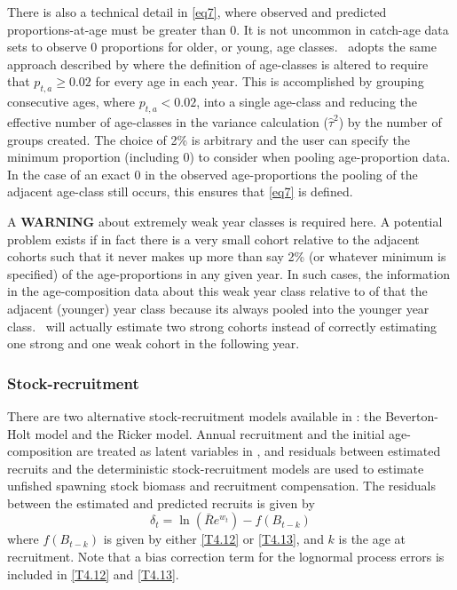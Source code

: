 \begin{multicols}{2}
There is also a technical detail in \eqref{eq7}, where observed and predicted proportions-at-age must be greater than 0.  It is not uncommon in catch-age data sets to observe 0 proportions for older, or young, age classes.  \iscam\ adopts the same approach described by \cite{richards1997visualizing} where the definition of age-classes is altered to require that $p_{t,a}\geq 0.02$ for every age in each year.  This is accomplished by grouping consecutive ages, where $p_{t,a} <0.02$, into a single age-class and reducing the effective number of age-classes in the variance calculation ($\widehat{\tau}^2$) by the number of groups created.  The choice of 2\% is arbitrary and the user can specify the minimum proportion (including 0) to consider when pooling age-proportion data.  In the case of an exact 0 in the observed age-proportions the pooling of the adjacent age-class still occurs, this ensures that \eqref{eq7} is defined.


A \textbf{WARNING} about extremely weak year classes is required here.  A potential problem exists if in fact there is a very small cohort relative to the adjacent cohorts such that it never makes up more than say 2\% (or whatever minimum is specified) of the age-proportions in any given year.  In such cases, the information in the age-composition data about this weak year class relative to of that the adjacent (younger) year class because its always pooled into the younger year class.  \iscam\ will actually estimate two strong cohorts instead of correctly estimating one strong and one weak cohort in the following year.

\subsubsection{Stock-recruitment}
There are two alternative stock-recruitment models available in \iscam: the Beverton-Holt model and the Ricker model.  Annual recruitment and the initial age-composition are treated as latent variables in \iscam, and residuals between estimated recruits and the deterministic stock-recruitment models are used to estimate unfished spawning stock biomass and recruitment compensation.  The residuals between the estimated and predicted recruits is given by
\begin{equation}\label{eq9}
    \delta_t = \ln(\bar{R}e^{w_t}) - f(B_{t-k})
\end{equation}
where $f(B_{t-k})$ is given by either \eqref{T4.12} or \eqref{T4.13}, and $k$ is the age at recruitment.  Note that a bias correction term for the lognormal process  errors is included in  \eqref{T4.12} and \eqref{T4.13}.


\end{multicols}
